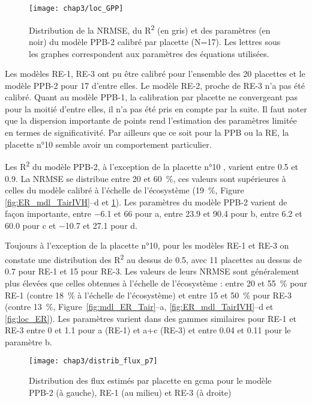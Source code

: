 \begin{figure}
\centering
\texttt{[image: chap3/loc\_GPP]}
\caption{Distribution de la NRMSE, du R\textsuperscript{2} (en gris) et des paramètres (en noir) du modèle PPB-2 calibré par placette (N=17). Les lettres sous les graphes correspondent aux paramètres des équations utilisées.}
\label{fig:loc_GPP}
\end{figure}

Les modèles RE-1, RE-3 ont pu être calibré pour l'ensemble des 20 placettes et le modèle PPB-2 pour 17 d'entre elles.
Le modèle RE-2, proche de RE-3 n'a pas été calibré.
Quant au modèle PPB-1, la calibration par placette ne convergeant pas pour la moitié d'entre elles, il n'a pas été pris en compte par la suite.
Il faut noter que la dispersion importante de points rend l'estimation des paramètres limitée en termes de significativité.
Par ailleurs que ce soit pour la PPB ou la RE, la placette n°10 semble avoir un comportement particulier.


Les R\textsuperscript{2} du modèle PPB-2, à l'exception de la placette n°10 , varient entre \num{0.5} et \num{0.9}.
La NRMSE se distribue entre 20 et \SI{60}{\percent}, ces valeurs sont supérieures à celles du modèle calibré à l'échelle de l'écosystème (\SI{19}{\percent}, Figure~ \ref{fig:ER_mdl_TairIVH}--d et \ref{fig:loc_GPP}).
Les paramètres du modèle PPB-2 varient de façon importante, entre \num{-6.1} et \num{66} pour a, entre \num{23.9} et \num{90.4} pour b, entre \num{6.2} et \num{60.0} pour c et \num{-10.7} et \num{27.1} pour d.

Toujours à l'exception de la placette n°10, pour les modèles RE-1 et RE-3 on constate une distribution des R\textsuperscript{2} au dessus de \num{0.5}, avec 11 placettes au dessus de \num{0.7} pour RE-1 et 15 pour RE-3.
Les valeurs de leurs NRMSE sont généralement plus élevées que celles obtenues à l'échelle de l'écosystème : entre 20 et \SI{55}{\percent} pour RE-1 (contre \SI{18}{\percent} à l'échelle de l'écosystème) et entre 15 et \SI{50}{\percent} pour RE-3 (contre \SI{13}{\percent}, Figure~\ref{fig:mdl_ER_Tair}--a, \ref{fig:ER_mdl_TairIVH}--d et \ref{fig:loc_ER}).
Les paramètres varient dans des gammes similaires pour RE-1 et RE-3 entre 0 et \num{1.1} pour a (RE-1) et a+c (RE-3) et entre \num{0.04} et \num{0.11} pour le paramètre b.


\begin{figure}
\centering
\texttt{[image: chap3/distrib\_flux\_p7]}
\caption{Distribution des flux estimés par placette en \si{gcma} pour le modèle PPB-2 (à gauche), RE-1 (au milieu) et RE-3 (à droite)}
\label{fig:distrib_fl_p7}
\end{figure}


